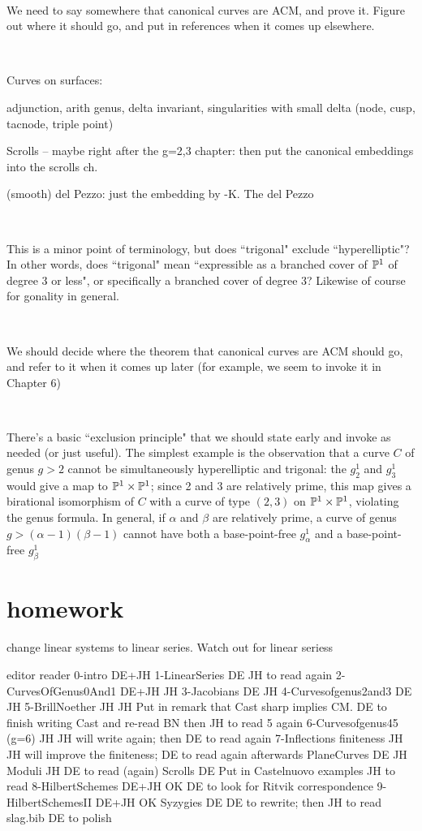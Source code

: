 \documentclass[12pt, leqno]{book}
\begin{document}
\

We need to say somewhere that canonical curves are ACM, and prove it. Figure out where it should go, and put in references when it comes up elsewhere.

\

Curves on surfaces:

adjunction, arith genus, delta invariant, singularities with small delta (node, cusp, tacnode, triple point)

Scrolls -- maybe right after the g=2,3 chapter:   then put the canonical embeddings into the scrolls ch.

(smooth) del Pezzo: just the embedding by -K. The del Pezzo 

\

This is a minor point of terminology, but does ``trigonal" exclude ``hyperelliptic"? In other words, does ``trigonal" mean ``expressible as a branched cover of $\PP^1$ of degree 3 or less", or specifically a branched cover of degree 3? Likewise of course for gonality in general.

\

We should decide where the theorem that canonical curves are ACM should go, and refer to it when it comes up later (for example, we seem to invoke it in Chapter 6)

\

There's a basic ``exclusion principle" that we should state early and invoke as needed (or just useful). The simplest example is the observation that a curve $C$ of genus $g > 2$ cannot be simultaneously hyperelliptic and trigonal: the $g^1_2$ and $g^1_3$ would give a map to $\PP^1 \times \PP^1$; since 2 and 3 are relatively prime, this map gives a birational isomorphism of $C$ with a curve of type $(2,3)$ on $\PP^1 \times \PP^1$, violating the genus formula. In general, if $\alpha$ and $\beta$ are relatively prime, a curve of genus $g > (\alpha - 1)(\beta - 1)$ cannot have both a base-point-free $g^1_\alpha$ and a base-point-free $g^1_\beta$

\section{homework}

change linear systems to linear series. Watch out for linear seriess

						editor	reader
{0-intro}					DE+JH	
{1-LinearSeries} 					DE JH to read again
{2-CurvesOfGenus0And1}		DE+JH	JH		
{3-Jacobians}				DE		JH
{4-Curvesofgenus2and3}		DE		JH
{5-BrillNoether}				JH		JH  Put in remark that Cast sharp implies CM. DE to finish writing Cast and re-read BN then JH to read 5 again
{6-Curvesofgenus45}		(g=6)	JH JH will write again; then DE to read again
{7-Inflections} 				finiteness	JH JH will improve the finiteness; DE to read again afterwards
{PlaneCurves}				DE		JH
{Moduli}							JH  DE to read (again)
{Scrolls}							DE Put in Castelnuovo examples JH to read
{8-HilbertSchemes}			DE+JH		OK  DE to look for Ritvik correspondence
{9-HilbertSchemesII}			DE+JH		OK
{Syzygies}					DE			DE to rewrite; then JH to read
slag.bib								DE to polish
\end{document}
